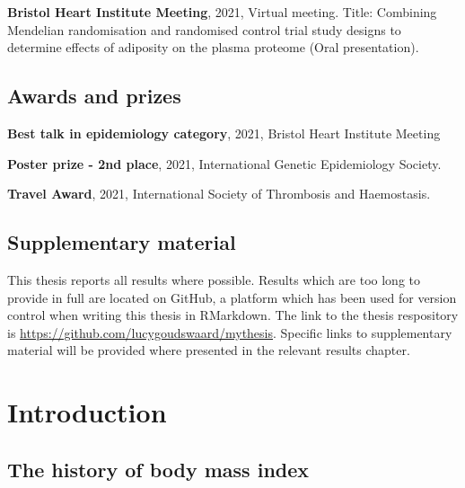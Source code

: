 \documentclass[11pt,twoside]{bristolthesis}
\begin{document}
\textbf{Bristol Heart Institute Meeting}, 2021, Virtual meeting. Title: Combining Mendelian randomisation and randomised control trial study designs to determine effects of adiposity on the plasma proteome (Oral presentation).

\hypertarget{awards-and-prizes}{%
\section{Awards and prizes}\label{awards-and-prizes}}

\textbf{Best talk in epidemiology category}, 2021, Bristol Heart Institute Meeting

\textbf{Poster prize - 2nd place}, 2021, International Genetic Epidemiology Society.

\textbf{Travel Award}, 2021, International Society of Thrombosis and Haemostasis.

\hypertarget{supplementary-material}{%
\section{Supplementary material}\label{supplementary-material}}

This thesis reports all results where possible. Results which are too long to provide in full are located on GitHub, a platform which has been used for version control when writing this thesis in RMarkdown. The link to the thesis respository is \url{https://github.com/lucygoudswaard/mythesis}. Specific links to supplementary material will be provided where presented in the relevant results chapter.

\hypertarget{background}{%
\chapter{Introduction}\label{background}}

\hypertarget{the-history-of-body-mass-index}{%
\section{The history of body mass index}\label{the-history-of-body-mass-index}}
\end{document}
